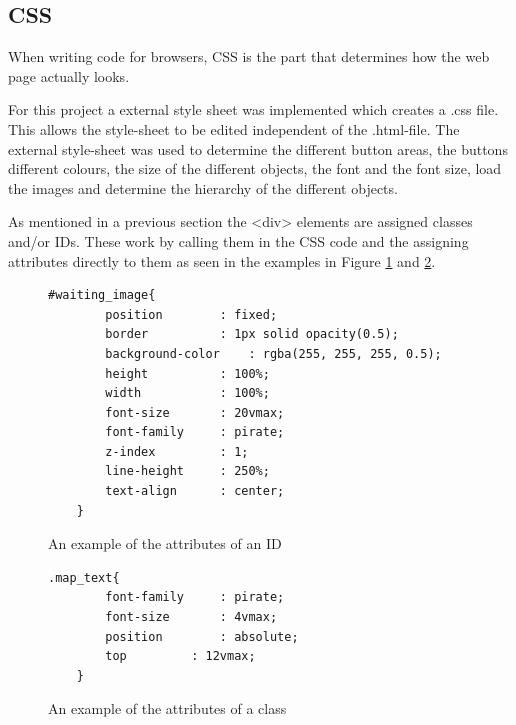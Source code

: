 \subsection{CSS}\label{controllerCSS}
When writing code for browsers, CSS is the part that determines how the web page actually looks.

For this project a external style sheet was implemented which creates a .css file. This allows the style-sheet to be edited independent of the .html-file. The external style-sheet was used to determine the different button areas, the buttons different colours, the size of the different objects, the font and the font size, load the images and determine the hierarchy of the different objects. 

As mentioned in a previous section the <div> elements are assigned classes and/or IDs. These work by calling them in the CSS code and the assigning attributes directly to them as seen in the examples in Figure \ref{IDex} and \ref{Classex}. 
\begin{figure}
\begin{lstlisting}
#waiting_image{
		position		: fixed;
		border			: 1px solid opacity(0.5);
		background-color	: rgba(255, 255, 255, 0.5);
		height			: 100%;
		width			: 100%;
		font-size		: 20vmax;
		font-family		: pirate;
		z-index			: 1;
		line-height		: 250%;
		text-align		: center;
	}
\end{lstlisting} 
\caption{An example of the attributes of an ID \label{IDex}}
\end{figure}

\begin{figure}
\begin{lstlisting}
.map_text{
		font-family		: pirate;
		font-size		: 4vmax;
		position		: absolute;
		top			: 12vmax;
	}
\end{lstlisting} 
\caption{An example of the attributes of a class \label{Classex}}
\end{figure}